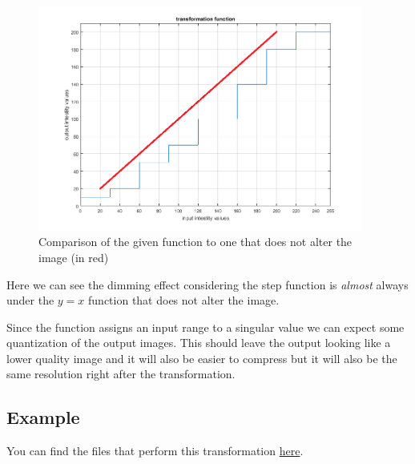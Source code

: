 \documentclass[12pt, a4paper]{article}
\begin{document}
\begin{figure}[H]
    \begin{center}
        \includegraphics[width=0.95\textwidth]{figures/step_fun_vs_y_eq_x.png}
    \end{center}
    \caption{Comparison of the given function to one that does not alter the image (in red)}\label{fig:funcCompare}
\end{figure}

\begin{multicols}{2}

    Here we can see the dimming effect considering the step function is \textit{almost} always under the $y = x$ function that does not alter the image.
    \newline

    Since the function assigns an input range to a singular value we can expect some quantization of the output images. This should leave the output looking like a lower quality image and it will also be easier to compress but it will also be the same resolution right after the transformation.
    \newline

    \subsection{Example} \label{subsec:example}

    You can find the files that perform this transformation \href{./src/}{here}.
    \newline

\end{multicols}
\end{document}
